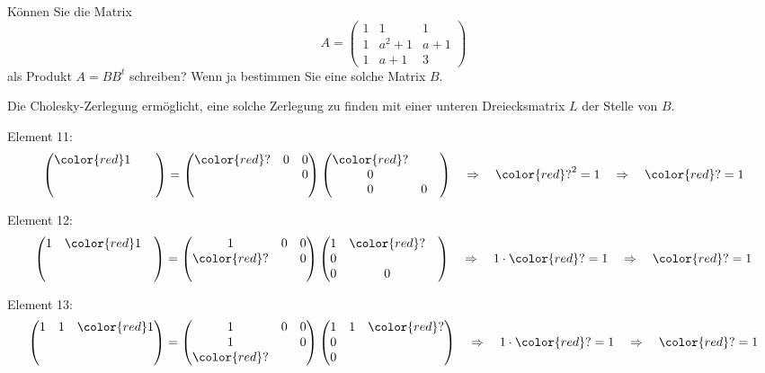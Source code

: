 Können Sie die Matrix 
\[
A
=
\begin{pmatrix}
  1&    1&1\\
  1&a^2+1&a+1\\
  1&a  +1&3
\end{pmatrix}
\]
als Produkt $A=BB^t$ schreiben?
Wenn ja bestimmen Sie eine solche Matrix $B$.

\begin{loesung}
Die Cholesky-Zerlegung ermöglicht, eine solche Zerlegung zu finden mit
einer unteren Dreiecksmatrix $L$ der Stelle von $B$.

Element 11:
\[
\begin{pmatrix}
\color{red}1&&\\
 &&\\
 &&
\end{pmatrix}
=
\begin{pmatrix}
{\color{red}?}&0&0\\
 & &0\\
 & &
\end{pmatrix}
\begin{pmatrix}
{\color{red}?}& & \\
0& & \\
0&0&
\end{pmatrix}
\quad\Rightarrow\quad
{\color{red}?}^2 = 1
\quad\Rightarrow\quad
{\color{red}?}=1
\]

Element 12:
\[
\begin{pmatrix}
1 & \color{red}1 & \\
  &              & \\
  &              &
\end{pmatrix}
=
\begin{pmatrix}
1           & 0 & 0\\
\color{red}?&   & 0\\
            &   &  
\end{pmatrix}
\begin{pmatrix}
1 &\color{red}? &  \\
0 &             &  \\
0 &           0 &  
\end{pmatrix}
\quad\Rightarrow\quad
1\cdot{\color{red}?} = 1
\quad\Rightarrow\quad
{\color{red}?} = 1
\]

Element 13:
\[
\begin{pmatrix}
1 & 1 & \color{red}1\\
  &   &             \\
  &   &
\end{pmatrix}
=
\begin{pmatrix}
1           & 0 & 0\\
1           &   & 0\\
\color{red}?&   &
\end{pmatrix}
\begin{pmatrix}
1 & 1 & \color{red}? \\
0 &   &              \\
0 &   &  
\end{pmatrix}
\quad\Rightarrow\quad
1\cdot{\color{red}?} = 1
\quad\Rightarrow\quad
{\color{red}?} = 1
\]


\end{loesung}
